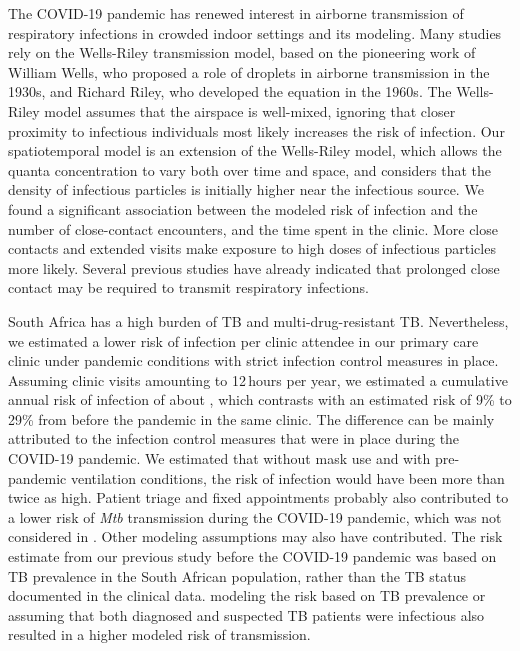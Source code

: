 \documentclass[fleqn,11pt]{wlscirep}
\begin{document}
The COVID-19 pandemic has renewed interest in airborne transmission of respiratory infections in crowded indoor settings\cite{Wang2021Science,Morawska2021,Greenhalgh2022BMJ} and its modeling\cite{Shen2021STBE,Buonanno2020EI,Edwards2024RiskAnalysis}. Many studies\cite{Andrews2014JID,Taylor2016IJTLD,Hella2017JInfect,Zemouri2020JDR} rely on the Wells-Riley transmission model\cite{Riley1961Book}, based on the pioneering work of William Wells, who proposed a role of droplets in airborne transmission in the 1930s\cite{Wells1934AJE}, and Richard Riley, who developed the equation in the 1960s\cite{Riley1961Book}.  The Wells-Riley model assumes that the airspace is well-mixed, ignoring that closer proximity to infectious individuals most likely increases the risk of infection. Our spatiotemporal model is an extension of the Wells-Riley model, which allows the quanta concentration to vary both over time and space, and considers that the density of infectious particles is initially higher near the infectious source\cite{Wang2021Science,Vuorinen2020SafSci,Chen2020BuildEnv}. We found a significant association between the modeled risk of infection and the number of close-contact encounters, and the time spent in the clinic. More close contacts and extended visits make exposure to high doses of infectious particles more likely. Several previous studies have already indicated that prolonged close contact may be required to transmit respiratory infections\cite{Leung2020NatMed,Brankston2007LancetID,Narasimhan2013PulmonaryMed}. 

South Africa has a high burden of TB and multi-drug-resistant TB\cite{WHO2023TBReport}. Nevertheless, we estimated a lower risk of infection per clinic attendee in our primary care clinic under pandemic conditions with strict infection control measures in place. Assuming clinic visits amounting to 12\,hours per year, we estimated a cumulative annual risk of infection of about , which contrasts with an estimated risk of 9\% to 29\% from before the pandemic in the same clinic\cite{Zurcher2022JID}. The difference can be mainly attributed to the infection control measures that were in place during the COVID-19 pandemic. We estimated that without mask use and with pre-pandemic ventilation conditions, the risk of infection would have been more than twice as high. Patient triage and fixed appointments probably also contributed to a lower risk of \emph{Mtb} transmission during the COVID-19 pandemic, which was not considered in . Other modeling assumptions may also have contributed. The risk estimate from our previous study before the COVID-19 pandemic\cite{Zurcher2022JID} was based on TB prevalence in the South African population, rather than the TB status documented in the clinical data. modeling the risk based on TB prevalence or assuming that both diagnosed and suspected TB patients were infectious also resulted in a higher modeled risk of transmission. 
\end{document}
